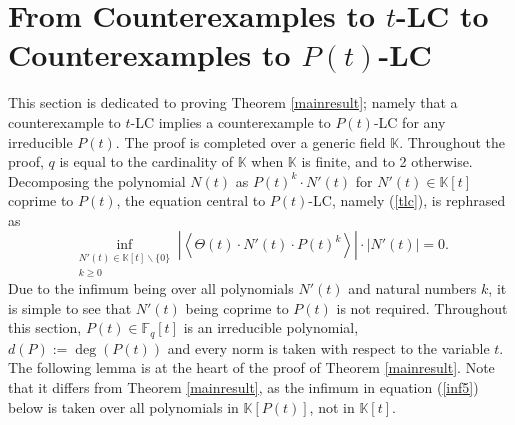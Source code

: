 \documentclass{article}
\theoremstyle{definition}
\newcommand{\K}{\mathbb{K}}
\newcommand{\F}{\mathbb{F}}
\numberwithin{equation}{subsection}
\begin{document}
\section{From Counterexamples to $t$-LC to Counterexamples to $P(t)$-LC}

\noindent This section is dedicated to proving Theorem \ref{mainresult}; namely that a counterexample to $t$-LC implies a counterexample to $P(t)$-LC for any irreducible $P(t)$. The proof is completed over a generic field $\K$. Throughout the proof, $q$ is equal to the cardinality of $\K$ when $\K$ is finite, and to 2 otherwise. \\

\noindent Decomposing the polynomial $N(t)$ as $P(t)^k\cdot N'(t)$ for $N'(t)\in\K[t]$ coprime to $P(t)$, the equation central to $P(t)$-LC, namely (\ref{tlc}), is rephrased as \begin{equation}
\inf_{\substack{N'(t)\in\K[t]\backslash\{0\}\\k\ge0}} \left|\left\langle\Theta(t)\cdot N'(t) \cdot P(t)^k\right\rangle\right|\cdot|N'(t)|=0. 
\end{equation} \noindent Due to the infimum being over all polynomials $N'(t)$ and natural numbers $k$, it is simple to see that $N'(t)$ being coprime to $P(t)$ is not required. Throughout this section, $P(t)\in\F_q[t]$ is an irreducible polynomial, $d(P):=\deg(P(t))$ and every norm is taken with respect to the variable $t$. The following lemma is at the heart of the proof of Theorem \ref{mainresult}. Note that it differs from Theorem \ref{mainresult}, as the infimum in equation (\ref{inf5}) below is taken over all polynomials in $\K[P(t)]$, not in $\K[t]$.
   
\end{document}
